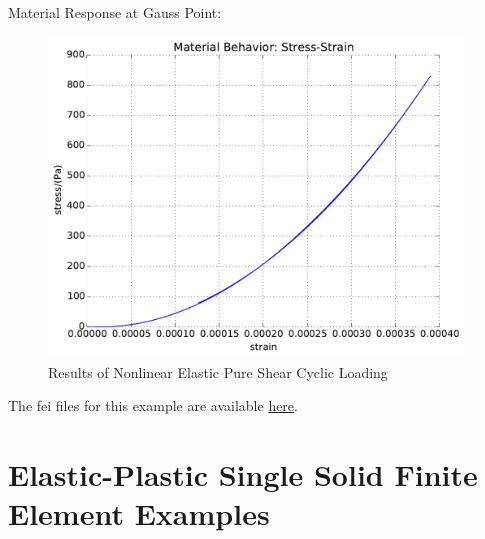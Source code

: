 \documentclass[fleqn,11pt]{article}
\begin{document}
Material Response at Gauss Point:

\begin{figure}[H]
\begin{center}
\includegraphics[width=11cm]{../fei_examples/nonlinear_elastic_solid/2pure_shear_cyclic_loading/result.pdf}
\caption{
\label{Results_Nonlinear Elastic Pure Shear Cyclic Loadin}
Results of Nonlinear Elastic Pure Shear Cyclic Loading}
\end{center}
\end{figure}

The fei files for this example are available \href{https://github.com/yuan-energy/education_examples/tree/master/fei_examples/nonlinear_elastic_solid/2pure_shear_cyclic_loading}{here}.











\newpage
\section{Elastic-Plastic Single Solid Finite Element Examples}
\label{section_elastoplastic_brick_example}
\end{document}
